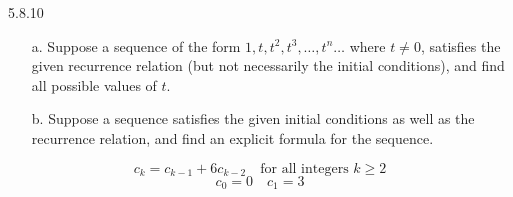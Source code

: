\begin{question}
    {5.8.10}
    {
        \begin{enumerate}
            \item[a.] Suppose a sequence of the form $1,t,t^2,t^3, \ldots, t^n \ldots$ where $t \neq 0$, satisfies the given recurrence relation (but not necessarily the initial conditions), and find all possible values of $t$.
            \item[b.] Suppose a sequence satisfies the given initial conditions as well as the recurrence relation, and find an explicit formula for the sequence.
        \end{enumerate}
        \begin{equation*}
            c_k = c_{k-1} + 6c_{k-2} \quad \text{for all integers $k \geq 2$}
        \end{equation*}
        \begin{equation*}
            c_0 = 0 \quad c_1=3
        \end{equation*}
    }
\end{question}
